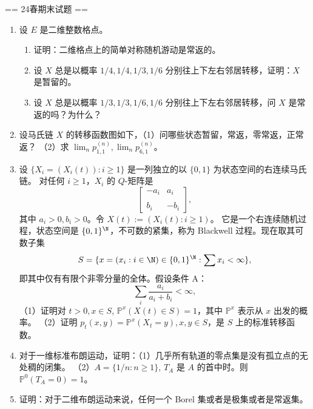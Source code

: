 == 24春期末试题 ==
\begin{enumerate}
\item 设 $E$ 是二维整数格点。
\begin{enumerate}[label=(\alph*)]
\item 证明：二维格点上的简单对称随机游动是常返的。
\item 设 $X$ 总是以概率 $1/4,1/4,1/3,1/6$ 分别往上下左右邻居转移，证明：$X$ 是暂留的。
\item 设 $X$ 总是以概率 $1/3,1/3,1/6,1/6$ 分别往上下左右邻居转移，问 $X$ 是常返的吗？为什么？
\end{enumerate}
\item 设马氏链 $X$ 的转移函数图如下，（1）问哪些状态暂留，常返，零常返，正常返？
（2）求 $\lim_n p_{1,1}^{(n)}, \lim_n p_{6,1}^{(n)}$。
\item 设 $\{X_i=(X_i(t)): i \geqslant 1\}$ 是一列独立的以 $\{0,1\}$ 为状态空间的右连续马氏链。
对任何 $i \geqslant 1$，$X_i$ 的 $Q$-矩阵是
\[\begin{bmatrix}
-a_i & a_i \\ \\
b_i & -b_i
\end{bmatrix},\]
其中 $a_i>0, b_i>0$。令 $X(t):=(X_i(t): i \geqslant 1)$。
它是一个右连续随机过程，状态空间是 $\{0,1\}^\N$，不可数的紧集，称为 Blackwell 过程。现在取其可数子集
\[S=\{x=(x_i: i \in \N) \in\{0,1\}^\N: \sum x_i<\infty\},\]
即其中仅有有限个非零分量的全体。假设条件 A：
\[\sum_i \frac{a_i}{a_i+b_i}<\infty,\]
（1）证明对 $t>0, x \in S$, $\mathbb{P}^x(X(t) \in S)=1$，其中 $\mathbb{P}^x$ 表示从 $x$ 出发的概率。
（2）证明 $p_t(x,y)=\mathbb{P}^x(X_t=y), x, y \in S$，是 $S$ 上的标准转移函数。
\item 对于一维标准布朗运动，证明：（1）几乎所有轨道的零点集是没有孤立点的无处稠的闭集。
（2）$A=\{1/n: n \geqslant 1\}$, $T_A$ 是 $A$ 的首中时。则 $\mathbb{P}^0(T_A=0)=1$。
\item 证明：对于二维布朗运动来说，任何一个 Borel 集或者是极集或者是常返集。
\end{enumerate}